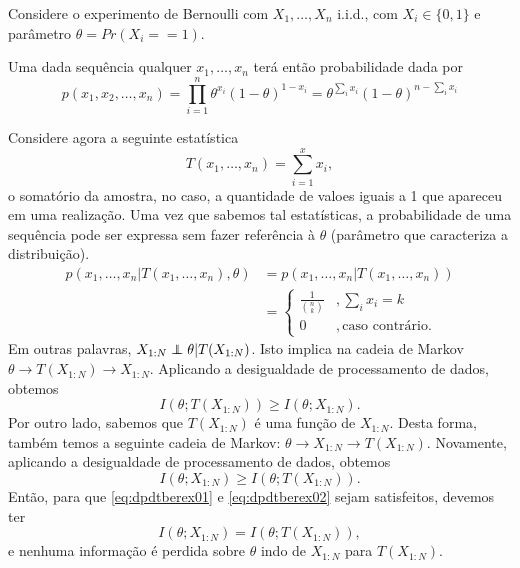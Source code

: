\begin{example}\label{ex:ensaiobernoulliT}
  Considere o experimento de Bernoulli com $X_1, \ldots, X_n$ i.i.d., com $X_i \in \{0, 1\}$ e
  parâmetro $\theta = Pr(X_i == 1)$.

  Uma dada sequência qualquer $x_1, \ldots, x_n$ terá então probabilidade dada por
  \begin{equation}
  p(x_1,x_2,\ldots,x_n) = \prod_{i=1}^n \theta^{x_i} (1-\theta)^{1-x_i} = \theta^{\sum_i x_i} (1-\theta)^{n - \sum_i x_i}
  \end{equation}

  Considere agora a seguinte estatística
  \begin{equation}
    T(x_1,\ldots, x_n) = \sum_{i=1}^{x} x_i ,
  \end{equation}
  o somatório da amostra, no caso, a quantidade de valoes iguais a 1 que apareceu em uma realização.
  Uma vez que sabemos tal estatísticas, a probabilidade de uma sequência pode ser expressa
  sem fazer referência à $\theta$ (parâmetro que caracteriza a distribuição).
  \begin{subequations}\label{eq:TsuficienteSum}
    \begin{align}
      p(x_1,\ldots,x_n|T(x_1,\ldots,x_n),\theta) &= p(x_1,\ldots,x_n|T(x_1,\ldots,x_n)) \\
                                                &= \begin{cases}
                                                   \frac{1}{{n \choose k}} & , \sum_i x_i = k \\
                                                   0       & , \text{caso contrário}.
                                                   \end{cases}
    \end{align}
  \end{subequations}
  Em outras palavras, $X_{1:N} \independent \theta | T(X_{1:N})$. 
  Isto implica na cadeia de Markov $\theta \rightarrow T(X_{1:N}) \rightarrow X_{1:N}$.
  Aplicando a desigualdade de processamento de dados, obtemos
  \begin{equation}\label{eq:dpdtberex01}
    I(\theta;T(X_{1:N})) \geq I(\theta;X_{1:N}).
  \end{equation}
  Por outro lado, sabemos que $T(X_{1:N})$ é uma função de $X_{1:N}$.
  Desta forma, também temos a seguinte cadeia de Markov: $\theta \rightarrow X_{1:N} \rightarrow T(X_{1:N})$.
  Novamente, aplicando a desigualdade de processamento de dados, obtemos
  \begin{equation}\label{eq:dpdtberex02}
    I(\theta;X_{1:N}) \geq I(\theta;T(X_{1:N})).
  \end{equation}
  Então, para que \ref{eq:dpdtberex01} e \ref{eq:dpdtberex02} sejam satisfeitos, devemos ter
  \begin{equation}
    I(\theta;X_{1:N}) = I(\theta;T(X_{1:N})) ,
  \end{equation}
  e nenhuma informação é perdida sobre $\theta$ indo de $X_{1:N}$ para $T(X_{1:N})$.
\end{example}





